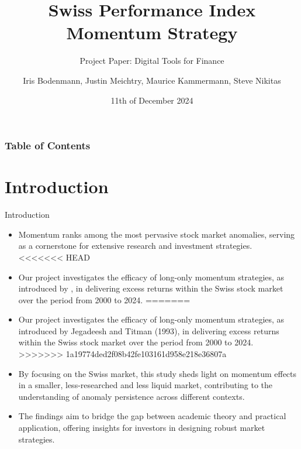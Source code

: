 \documentclass[10pt]{beamer}
\title{Swiss Performance Index Momentum Strategy}
\subtitle{Project Paper: Digital Tools for Finance}
\author{Iris Bodenmann, Justin Meichtry, Maurice Kammermann, Steve Nikitas}
\date{11th of December 2024}
\institute[]{Igor Pozdeev\\Department of Finance\\ University of Zurich}
\begin{document}
\begin{frame}
\maketitle
\end{frame}

\begin{frame}
\frametitle{Table of Contents}
\tableofcontents
\end{frame}

\section{Introduction}
\begin{frame}{Introduction}
\begin{itemize}
    \item Momentum ranks among the most pervasive stock market anomalies, serving as a cornerstone for extensive research and investment strategies.
<<<<<<< HEAD
    \item Our project investigates the efficacy of long-only momentum strategies, as introduced by \cite{jegatit1993}, in delivering excess returns within the Swiss stock market over the period from 2000 to 2024.
=======
    \item Our project investigates the efficacy of long-only momentum strategies, as introduced by Jegadeesh and Titman (1993), in delivering excess returns within the Swiss stock market over the period from 2000 to 2024.
>>>>>>> 1a19774ded2f08b42fe103161d958e218e36807a
    \item By focusing on the Swiss market, this study sheds light on momentum effects in a smaller, less-researched and less liquid market, contributing to the understanding of anomaly persistence across different contexts.
    \item The findings aim to bridge the gap between academic theory and practical application, offering insights for investors in designing robust market strategies.
\end{itemize}
\end{frame}



\end{document}
